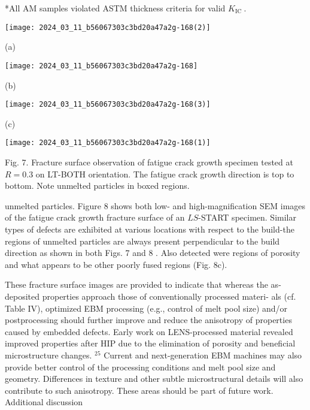 \documentclass[10pt]{article}
\begin{document}
*All AM samples violated ASTM thickness criteria for valid $K_{\text {IC }}$.

\begin{center}
\texttt{[image: 2024\_03\_11\_b56067303c3bd20a47a2g-168(2)]}
\end{center}

(a)

\begin{center}
\texttt{[image: 2024\_03\_11\_b56067303c3bd20a47a2g-168]}
\end{center}

(b)

\begin{center}
\texttt{[image: 2024\_03\_11\_b56067303c3bd20a47a2g-168(3)]}
\end{center}

(c)

\begin{center}
\texttt{[image: 2024\_03\_11\_b56067303c3bd20a47a2g-168(1)]}
\end{center}

Fig. 7. Fracture surface observation of fatigue crack growth specimen tested at $R=0.3$ on LT-BOTH orientation. The fatigue crack growth direction is top to bottom. Note unmelted particles in boxed regions.

unmelted particles. Figure 8 shows both low- and high-magnification SEM images of the fatigue crack growth fracture surface of an $L S$-START specimen. Similar types of defects are exhibited at various locations with respect to the build-the regions of unmelted particles are always present perpendicular to the build direction as shown in both Figs. 7 and 8 . Also detected were regions of porosity and what appears to be other poorly fused regions (Fig. 8c).

These fracture surface images are provided to indicate that whereas the as-deposited properties approach those of conventionally processed materi- als (cf. Table IV), optimized EBM processing (e.g., control of melt pool size) and/or postprocessing should further improve and reduce the anisotropy of properties caused by embedded defects. Early work on LENS-processed material revealed improved properties after HIP due to the elimination of porosity and beneficial microstructure changes. ${ }^{25}$ Current and next-generation EBM machines may also provide better control of the processing conditions and melt pool size and geometry. Differences in texture and other subtle microstructural details will also contribute to such anisotropy. These areas should be part of future work. Additional discussion
\end{document}
